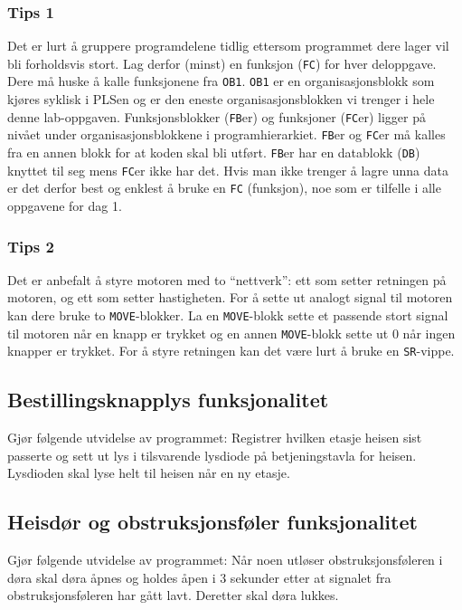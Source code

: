 \subsubsection*{Tips 1}
Det er lurt å gruppere programdelene tidlig ettersom programmet dere lager vil bli forholdsvis stort. Lag derfor (minst) en funksjon (\verb|FC|) for hver deloppgave. Dere må huske å kalle funksjonene fra \verb|OB1|. \verb|OB1| er en organisasjonsblokk som kjøres
syklisk i PLSen og er den eneste organisasjonsblokken vi trenger i hele denne lab-oppgaven.
Funksjonsblokker (\verb|FB|er) og funksjoner (\verb|FC|er) ligger på nivået under organisasjonsblokkene
i programhierarkiet. \verb|FB|er og \verb|FC|er må kalles fra en annen blokk for at koden skal bli utført.
\verb|FB|er har en datablokk (\verb|DB|) knyttet til seg mens \verb|FC|er ikke har det. Hvis man ikke trenger å lagre unna data er det derfor best og enklest å bruke en \verb|FC| (funksjon), noe som er tilfelle i alle
oppgavene for dag 1.

\subsubsection*{Tips 2}
Det er anbefalt å styre motoren med to “nettverk”: ett som setter retningen på motoren, og ett som
setter hastigheten. For å sette ut analogt signal til motoren kan dere bruke to \verb|MOVE|-blokker.
La en \verb|MOVE|-blokk sette et passende stort signal til motoren når en knapp er trykket og en
annen \verb|MOVE|-blokk sette ut 0 når ingen knapper er trykket. For å styre retningen kan det være
lurt å bruke en \verb|SR|-vippe.

\subsection{Bestillingsknapplys funksjonalitet}

Gjør følgende utvidelse av programmet: Registrer hvilken etasje heisen sist
passerte og sett ut lys i tilsvarende lysdiode på betjeningstavla for heisen. Lysdioden skal lyse
helt til heisen når en ny etasje.

\subsection{Heisdør og obstruksjonsføler funksjonalitet}

Gjør følgende utvidelse av programmet: Når noen utløser obstruksjonsføleren i
døra skal døra åpnes og holdes åpen i 3 sekunder etter at signalet fra obstruksjonsføleren har
gått lavt. Deretter skal døra lukkes.

